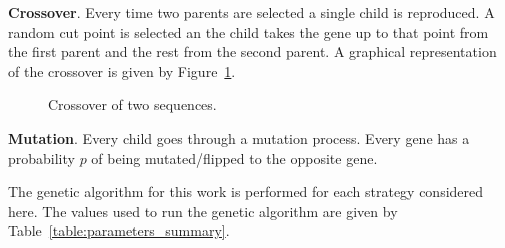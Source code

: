 \documentclass{article}
\begin{document}
\textbf{Crossover}. Every time two parents are selected a single child
is reproduced. A random cut point is selected an the child takes the
gene up to that point from the first parent and the rest from the second
parent. A graphical representation of the crossover is given by Figure~\ref{fig:crossover}.

\begin{figure}[!htbp]
    \centering
    
    \caption{Crossover of two sequences.}\label{fig:crossover}
\end{figure}

\textbf{Mutation}. Every child goes through a mutation process. 
Every gene has a probability \(p\) of being mutated/flipped to the opposite gene.

%     

The genetic algorithm for this work is performed for each strategy considered here.
The values used to run the genetic algorithm are given by
Table~\ref{table:parameters_summary}.

\begin{table}[!htbp]
    \begin{center}
    \end{center}
    \caption{The parameters of the genetic algorithm.}\label{table:parameters_summary}
\end{table}
\end{document}
